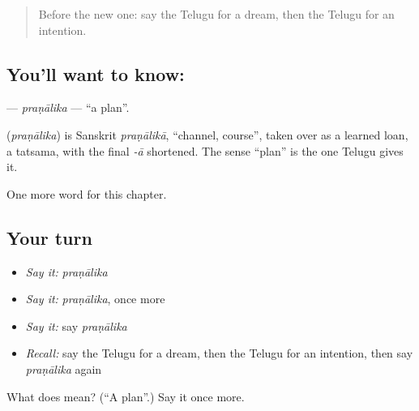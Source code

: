 \label{lesson:TE-C107-pranalika}



\begin{quote}
Before the new one: say the Telugu for a dream, then the Telugu for an intention.
\end{quote}

\subsection*{You'll want to know: }
\textbf{} — \emph{praṇālika} — \textquotedblleft{}a plan\textquotedblright{}.

\begin{cousinweb}
\textbf{} (\emph{praṇālika}) is Sanskrit \emph{praṇālikā}, \textquotedblleft{}channel, course\textquotedblright{}, taken over as a learned loan, a tatsama, with the final \emph{-ā} shortened. The sense \textquotedblleft{}plan\textquotedblright{} is the one Telugu gives it.
\end{cousinweb}

\begin{grammarlens}[title={What you've built}]
One more word for this chapter.
\end{grammarlens}

\subsection*{Your turn}
\begin{itemize}
\raggedright
  \item \emph{Say it:} \emph{praṇālika}
  \item \emph{Say it:} \emph{praṇālika}, once more
  \item \emph{Say it:} say \emph{praṇālika}
  \item \emph{Recall:} say the Telugu for a dream, then the Telugu for an intention, then say \emph{praṇālika} again
\end{itemize}

\begin{tcolorbox}[breakable,colback=teal!4,colframe=teal!35!black,title={Before you move on}]
What does  mean? (\textquotedblleft{}A plan\textquotedblright{}.) Say it once more.
\end{tcolorbox}

